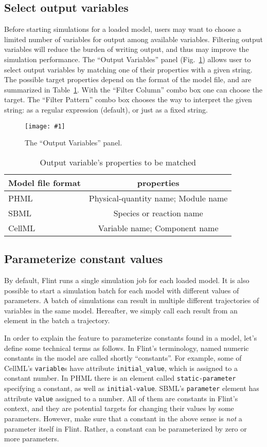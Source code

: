\documentclass[a4paper,10pt]{report}
\newcommand\FigureOfImage[2]{\begin{figure}[h]
  \centering
  \texttt{[image: \#1]}
  \caption{#2}\label{fig:#1}
\end{figure}}
\begin{document}
\subsection{Select output variables}
Before starting simulations for a loaded model, users may want to choose a
limited number of variables for output among available variables.
Filtering output variables will reduce the burden of writing output, and thus
may improve the simulation performance.
The ``Output Variables'' panel (Fig.~\ref{fig:lr-output-variables}) allows
user to select output variables by matching one of their properties with a given
string. The possible target properties depend on the format of the model file,
and are summarized in Table~\ref{tab:outputproperties}. With the ``Filter Column''
combo box one can choose the target. The ``Filter Pattern'' combo box chooses
the way to interpret the given string: as a regular expression (default), or
just as a fixed string.
\FigureOfImage{lr-output-variables}{The ``Output Variables'' panel.}
\begin{table}
\centering
\caption{Output variable's properties to be matched} \label{tab:outputproperties}
\begin{tabular}{l|c}
  Model file format & properties \\
  \hline
  PHML & Physical-quantity name; Module name \\
  SBML & Species or reaction name \\
  CellML & Variable name; Component name \\
\end{tabular}
\end{table}

\subsection{Parameterize constant values}
By default, Flint runs a single simulation job for each loaded model.
It is also possible to start a simulation batch for each model with
different values of parameters.
A batch of simulations can result in multiple different trajectories of
variables in the same model. Hereafter, we simply call each result from
an element in the batch a trajectory.

In order to explain the feature to parameterize constants found in a model,
let's define some technical terms as follows.
In Flint's terminology, named numeric constants in the model are called
shortly ``constants''.
For example, some of CellML's \verb|variable|s have attribute
\verb|initial_value|, which is assigned to a constant number.
In PHML there is an element called \verb|static-parameter| specifying a constant,
as well as \verb|initial-value|.
SBML's \verb|parameter| element has attribute \verb|value| assigned to a number.
All of them are constants in Flint's context, and they are potential targets for
changing their values by some parameters.
However, make sure that a constant in the above sense is \emph{not} a parameter
itself in Flint.
Rather, a constant can be parameterized by zero or more parameters.
\end{document}
